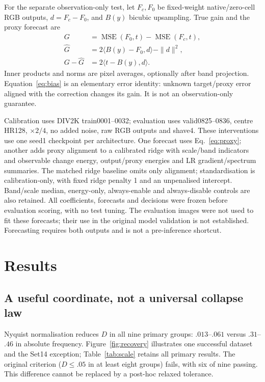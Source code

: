 For the separate observation-only test, let $F_c,F_0$ be fixed-weight
native/zero-cell RGB outputs, $d=F_c-F_0$, and $B(y)$ bicubic upsampling.
True gain and the proxy forecast are
\begin{align}
 G&=\operatorname{MSE}(F_0,t)-\operatorname{MSE}(F_c,t),\\
 \hat G&=2\langle B(y)-F_0,d\rangle-\|d\|^2,\label{eq:proxy}\\
 G-\hat G&=2\langle t-B(y),d\rangle.\label{eq:bias}
\end{align}
Inner products and norms are pixel averages, optionally after band
projection. Equation~\eqref{eq:bias} is an elementary error identity:
unknown target/proxy error aligned with the correction changes its gain.
It is not an observation-only guarantee.

Calibration uses DIV2K train0001--0032; evaluation uses valid0825--0836,
centre HR128, $\times2/4$, no added noise, raw RGB outputs and shave4.
These interventions use one seed1 checkpoint per architecture.
One forecast uses Eq.~\eqref{eq:proxy}; another adds proxy alignment to
a calibrated ridge with scale/band indicators and observable change
energy, output/proxy energies and LR gradient/spectrum summaries. The
matched ridge baseline omits only alignment; standardisation is
calibration-only, with fixed ridge penalty 1 and an unpenalised intercept.
Band/scale median, energy-only, always-enable and always-disable controls
are also retained. All coefficients, forecasts and decisions were frozen
before evaluation scoring, with no test tuning. The evaluation images
were not used to fit these forecasts; their use in the original model
validation is not established. Forecasting requires both outputs and is
not a pre-inference shortcut.

\section{Results}
\label{sec:results}
\subsection{A useful coordinate, not a universal collapse law}
Nyquist normalisation reduces $D$ in all nine primary groups:
$.013$--$.061$ versus $.31$--$.46$ in absolute frequency.
Figure~\ref{fig:recovery} illustrates one successful dataset and the
Set14 exception; Table~\ref{tab:scale} retains all primary results.
The original criterion ($D\le.05$ in at least eight groups) fails,
with six of nine passing. This difference cannot be replaced by a
post-hoc relaxed tolerance.

